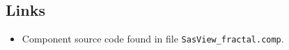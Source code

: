 \subsection*{Links}
\begin{itemize}
  \item Component source code found in file \texttt{SasView\_fractal.comp}.
\end{itemize}
